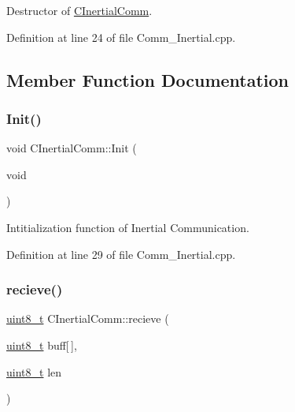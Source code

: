 Destructor of \mbox{\hyperlink{class_c_inertial_comm}{C\+Inertial\+Comm}}. 

Definition at line 24 of file Comm\+\_\+\+Inertial.\+cpp.



\subsection{Member Function Documentation}
\mbox{\label{class_c_inertial_comm_aa8c4c1dc4ca32817bb51c520c052b4c3}} 
\subsubsection{\texorpdfstring{Init()}{Init()}}
{\footnotesize\ttfamily void C\+Inertial\+Comm\+::\+Init (\begin{DoxyParamCaption}\item[{void}]{ }\end{DoxyParamCaption})}



Intitialization function of Inertial Communication. 



Definition at line 29 of file Comm\+\_\+\+Inertial.\+cpp.

\mbox{\label{class_c_inertial_comm_abaed54099a0192df5a9318dc99de3668}} 
\subsubsection{\texorpdfstring{recieve()}{recieve()}}
{\footnotesize\ttfamily \mbox{\hyperlink{_a_d_a_s___types_8h_aba7bc1797add20fe3efdf37ced1182c5}{uint8\+\_\+t}} C\+Inertial\+Comm\+::recieve (\begin{DoxyParamCaption}\item[{\mbox{\hyperlink{_a_d_a_s___types_8h_aba7bc1797add20fe3efdf37ced1182c5}{uint8\+\_\+t}}}]{buff\mbox{[}$\,$\mbox{]},  }\item[{\mbox{\hyperlink{_a_d_a_s___types_8h_aba7bc1797add20fe3efdf37ced1182c5}{uint8\+\_\+t}}}]{len }\end{DoxyParamCaption})}



